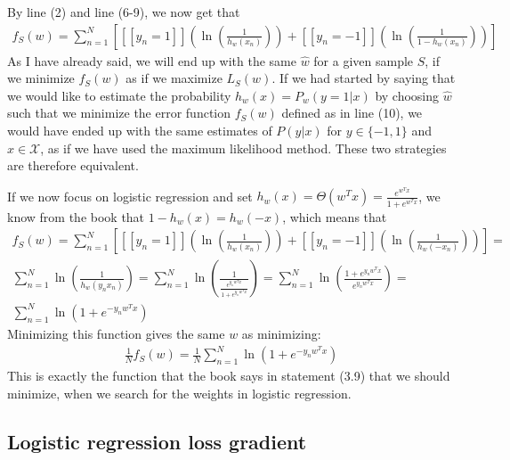 By line (2) and line (6-9), we now get that
\begin{align}
f_S(w) = \sum_{n=1}^N \left[ [[y_n = 1]]\left(\ln \left( \frac{1}{h_w(x_n)}\right)\right) + [[y_n = -1]]\left(\ln \left( \frac{1}{1 - h_w(x_n)}\right)\right) \right]
\end{align}
As I have already said, we will end up with the same $\hat{w}$ for a given sample $S$, if we minimize $f_S(w)$ as if we maximize $L_S(w)$. If we had started by saying that we would like to estimate the probability $h_w(x) = P_w(y = 1|x)$ by choosing $\hat{w}$ such that we minimize the error function $f_S(w)$ defined as in line (10), we would have ended up with the same estimates of $P(y|x)$ for $y \in \{-1,1\}$ and $x\in \mathcal{X}$, as if we have used the maximum likelihood method. These two strategies are therefore equivalent.

If we now focus on logistic regression and set $h_w(x) = \Theta(w^T x) = \frac{e^{w^Tx}}{1 + e^{w^Tx}}$, we know from the book that $1 - h_w(x) = h_w(-x)$, which means that
\begin{align}
f_S(w) = \sum_{n=1}^N \left[ [[y_n = 1]]\left(\ln \left( \frac{1}{h_w(x_n)}\right)\right) + [[y_n = -1]]\left(\ln \left( \frac{1}{h_w(-x_n)}\right)\right) \right] = \\
 \sum_{n=1}^N  \ln \left( \frac{1}{h_w(y_nx_n)}\right)  = \sum_{n=1}^N  \ln \left( \frac{1}{\frac{e^{y_nw^Tx}}{1 + e^{y_ nw^Tx}}}\right)  = \sum_{n=1}^N  \ln \left( \frac{1 + e^{y_ nw^Tx}}{e^{y_ nw^Tx}}\right)  = \\
 \sum_{n=1}^N  \ln \left( 1 +e^{-y_ nw^Tx}\right)
\end{align}
Minimizing this function gives the same $w$ as minimizing:
\begin{align}
\frac{1}{N}f_S(w) = \frac{1}{N} \sum_{n=1}^N  \ln \left( 1 +e^{-y_ nw^Tx}\right)
\end{align}
This is exactly the function that the book says in statement (3.9) that we should minimize, when we search for the weights in logistic regression.


\subsection{Logistic regression loss gradient}

